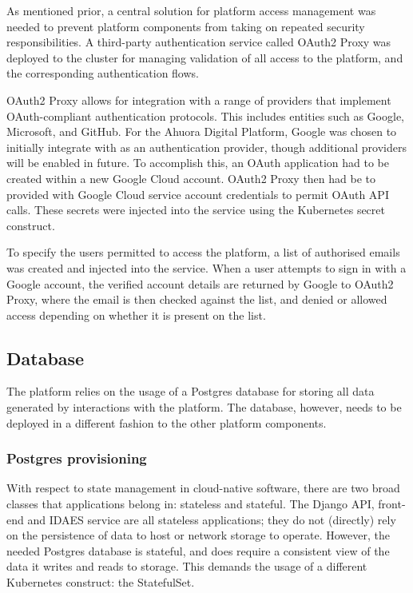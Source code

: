 As mentioned prior, a central solution for platform access management was needed to prevent platform components from taking on repeated security responsibilities. A third-party authentication service called OAuth2 Proxy was deployed to the cluster for managing validation of all access to the platform, and the corresponding authentication flows.

OAuth2 Proxy allows for integration with a range of providers that implement OAuth-compliant authentication protocols. This includes entities such as Google, Microsoft, and GitHub. For the Ahuora Digital Platform, Google was chosen to initially integrate with as an authentication provider, though additional providers will be enabled in future. To accomplish this, an OAuth application had to be created within a new Google Cloud account. OAuth2 Proxy then had be to provided with Google Cloud service account credentials to permit OAuth API calls. These secrets were injected into the service using the Kubernetes secret construct.


To specify the users permitted to access the platform, a list of authorised emails was created and injected into the service. When a user attempts to sign in with a Google account, the verified account details are returned by Google to OAuth2 Proxy, where the email is then checked against the list, and denied or allowed access depending on whether it is present on the list.

\subsection{Database}

The platform relies on the usage of a Postgres database for storing all data generated by interactions with the platform. The database, however, needs to be deployed in a different fashion to the other platform components. 

\subsubsection{Postgres provisioning}

With respect to state management in cloud-native software, there are two broad classes that applications belong in: stateless and stateful. The Django API, front-end and IDAES service are all stateless applications; they do not (directly) rely on the persistence of data to host or network storage to operate. However, the needed Postgres database is stateful, and does require a consistent view of the data it writes and reads to storage. This demands the usage of a different Kubernetes construct: the StatefulSet.

